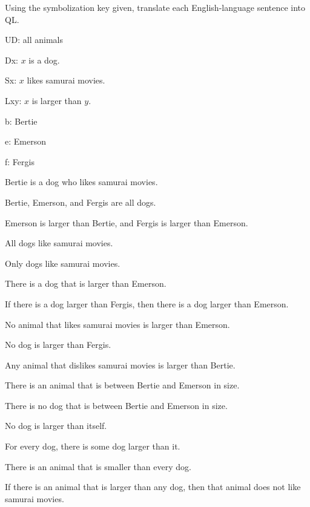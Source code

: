 \problempart Using the symbolization key given, translate each English-language sentence into QL.
\begin{ekey}
\item[UD:] all animals
\item[Dx:] $x$ is a dog.
\item[Sx:] $x$ likes samurai movies.
\item[Lxy:] $x$ is larger than $y$.
\item[b:] Bertie
\item[e:] Emerson
\item[f:] Fergis
\end{ekey}
\begin{earg}
\item Bertie is a dog who likes samurai movies.
\item Bertie, Emerson, and Fergis are all dogs.
\item Emerson is larger than Bertie, and Fergis is larger than Emerson.
\item All dogs like samurai movies.
\item Only dogs like samurai movies.
\item There is a dog that is larger than Emerson.
\item If there is a dog larger than Fergis, then there is a dog larger than Emerson.
\item No animal that likes samurai movies is larger than Emerson.
\item No dog is larger than Fergis.
\item Any animal that dislikes samurai movies is larger than Bertie.
\item There is an animal that is between Bertie and Emerson in size.
\item There is no dog that is between Bertie and Emerson in size.
\item No dog is larger than itself.
\item For every dog, there is some dog larger than it.
\item There is an animal that is smaller than every dog.
\item If there is an animal that is larger than any dog, then that animal does not like samurai movies.
\end{earg}

